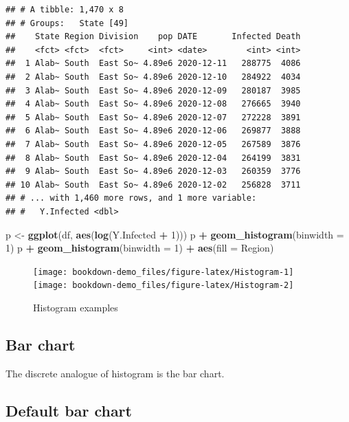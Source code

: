 \documentclass[]{book}
\newenvironment{Shaded}{\begin{snugshade}}{\end{snugshade}}
\newcommand{\KeywordTok}[1]{\textcolor[rgb]{0.13,0.29,0.53}{\textbf{#1}}}
\newcommand{\DataTypeTok}[1]{\textcolor[rgb]{0.13,0.29,0.53}{#1}}
\newcommand{\DecValTok}[1]{\textcolor[rgb]{0.00,0.00,0.81}{#1}}
\newcommand{\StringTok}[1]{\textcolor[rgb]{0.31,0.60,0.02}{#1}}
\newcommand{\OperatorTok}[1]{\textcolor[rgb]{0.81,0.36,0.00}{\textbf{#1}}}
\newcommand{\NormalTok}[1]{#1}
\begin{document}
\begin{verbatim}
## # A tibble: 1,470 x 8
## # Groups:   State [49]
##    State Region Division    pop DATE       Infected Death
##    <fct> <fct>  <fct>     <int> <date>        <int> <int>
##  1 Alab~ South  East So~ 4.89e6 2020-12-11   288775  4086
##  2 Alab~ South  East So~ 4.89e6 2020-12-10   284922  4034
##  3 Alab~ South  East So~ 4.89e6 2020-12-09   280187  3985
##  4 Alab~ South  East So~ 4.89e6 2020-12-08   276665  3940
##  5 Alab~ South  East So~ 4.89e6 2020-12-07   272228  3891
##  6 Alab~ South  East So~ 4.89e6 2020-12-06   269877  3888
##  7 Alab~ South  East So~ 4.89e6 2020-12-05   267589  3876
##  8 Alab~ South  East So~ 4.89e6 2020-12-04   264199  3831
##  9 Alab~ South  East So~ 4.89e6 2020-12-03   260359  3776
## 10 Alab~ South  East So~ 4.89e6 2020-12-02   256828  3711
## # ... with 1,460 more rows, and 1 more variable:
## #   Y.Infected <dbl>
\end{verbatim}

\begin{Shaded}
\begin{Highlighting}[]
\NormalTok{p <-}\StringTok{ }\KeywordTok{ggplot}\NormalTok{(df, }\KeywordTok{aes}\NormalTok{(}\KeywordTok{log}\NormalTok{(Y.Infected }\OperatorTok{+}\StringTok{ }\DecValTok{1}\NormalTok{))) }
\NormalTok{p }\OperatorTok{+}\StringTok{ }\KeywordTok{geom_histogram}\NormalTok{(}\DataTypeTok{binwidth =} \DecValTok{1}\NormalTok{)}
\NormalTok{p }\OperatorTok{+}\StringTok{ }\KeywordTok{geom_histogram}\NormalTok{(}\DataTypeTok{binwidth =} \DecValTok{1}\NormalTok{) }\OperatorTok{+}\StringTok{ }\KeywordTok{aes}\NormalTok{(}\DataTypeTok{fill =}\NormalTok{ Region) }
\end{Highlighting}
\end{Shaded}

\begin{figure}
\texttt{[image: bookdown-demo\_files/figure-latex/Histogram-1]} \texttt{[image: bookdown-demo\_files/figure-latex/Histogram-2]} \caption{Histogram examples}\label{fig:Histogram}
\end{figure}

\subsection{Bar chart}\label{bar-chart}

The discrete analogue of histogram is the bar chart.

\subsection{Default bar chart}\label{default-bar-chart}
\end{document}

